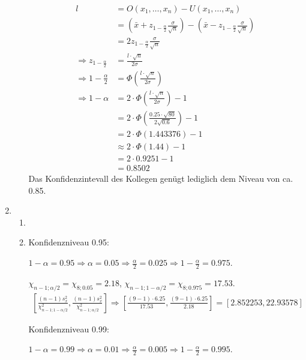 \documentclass[a4paper]{scrartcl}
\def \blattnr {8}
\begin{document}
\begin{enumerate}[label=\bfseries \blattnr.\arabic*]
\begin{enumerate}
\begin{equation*}
\begin{split}
	l 
	&=O(x_1,\ldots, x_n) - U(x_1,\ldots,x_n)  \\
	&= \left(\bar{x} + z_{1-\frac\alpha 2}\frac\sigma{\sqrt{n}}\right) - \left(\bar{x} - z_{1-\frac\alpha 2}\frac\sigma{\sqrt{n}}\right) \\
	&= 2z_{1-\frac\alpha 2}\frac\sigma{\sqrt{n}} \\
	\Rightarrow z_{1-\frac\alpha 2} &= \frac {l\cdot \sqrt{n}}{2\sigma} \\
	\Rightarrow 1-\frac\alpha 2 &= \Phi\left( \frac {l\cdot \sqrt{n}}{2\sigma} \right) \\
	\Rightarrow 1-\alpha &= 2\cdot \Phi\left( \frac {l\cdot \sqrt{n}}{2\sigma} \right) -1 \\
	&= 2\cdot \Phi\left( \frac{0.25 \cdot \sqrt{80}}{2 \sqrt{0.6}} \right) -1 \\
	&= 2\cdot \Phi(1.443376) -1 \\
	&\approx 2 \cdot \Phi(1.44) -1 \\
	&= 2 \cdot 0.9251 - 1 \\
	&= 0.8502
      \end{split}
    \end{equation*}
    Das Konfidenzintevall des Kollegen genügt lediglich dem Niveau von ca. 0.85.
\end{enumerate}

\item 

\begin{enumerate}
 \item 
 \item 
  Konfidenzniveau 0.95:
  
  $1-\alpha = 0.95 \Rightarrow \alpha=0.05 \Rightarrow \frac\alpha 2 = 0.025 \Rightarrow 1-\frac\alpha 2 = 0.975$.
  
  $\chi_{n-1;\alpha/2} = \chi_{8;0.05} = 2.18$, $\chi_{n-1;1-\alpha/2} = \chi_{8;0.975} = 17.53$.
  \begin{equation*}
    \begin{split}
      \left[ \frac{(n-1)s_x^2}{\chi^2_{n-1;1-\alpha /2}} \right.,\left. \frac{(n-1)s_x^2}{\chi^2_{n-1;\alpha /2}} \right] 
      \Rightarrow \left[ \frac{(9-1) \cdot 6.25}{17.53} \right.,\left. \frac{(9-1) \cdot 6.25}{2.18} \right] 
      = [2.852253 , 22.93578]
    \end{split}
  \end{equation*}
  
  Konfidenzniveau 0.99:
  
  $1-\alpha = 0.99 \Rightarrow \alpha=0.01 \Rightarrow \frac\alpha 2 = 0.005 \Rightarrow 1-\frac\alpha 2 = 0.995$.
  

\end{enumerate}
\end{enumerate}
\end{document}
